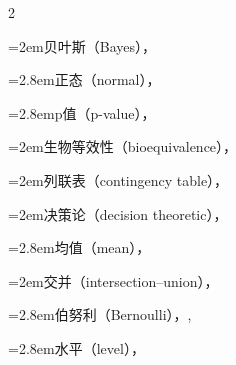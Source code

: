 \begin{multicols}{2}
\par\noindent\hangindent=2em\hspace*{1em}\label{idx:487}贝叶斯（Bayes），\hyperref[sec:8.5.2]{\pageref*{sec:8.5.2}}\par
{}
\par\noindent\hangindent=2.8em\hspace*{1.8em}\label{idx:488}正态（normal），\hyperref[ex:8.2.7]{\pageref*{ex:8.2.7}}\par
\par\noindent\hangindent=2.8em\hspace*{1.8em}\label{idx:489}p值（p-value），\hyperref[exercise:8.53]{\pageref*{exercise:8.53}}\par
\par\noindent\hangindent=2em\hspace*{1em}\label{idx:490}生物等效性（bioequivalence），\hyperref[exercise:8.47]{\pageref*{exercise:8.47}}\par
\par\noindent\hangindent=2em\hspace*{1em}\label{idx:491}列联表（contingency table），\hyperref[exercise:10.31]{\pageref*{exercise:10.31}}\par
\par\noindent\hangindent=2em\hspace*{1em}\label{idx:492}决策论（decision theoretic），\hyperref[sec:8.3.5]{\pageref*{sec:8.3.5}}\par
\par\noindent\hangindent=2.8em\hspace*{1.8em}\label{idx:493}均值（mean），\hyperref[ex:8.3.31]{\pageref*{ex:8.3.31}}\par
\par\noindent\hangindent=2em\hspace*{1em}\label{idx:494}交并（intersection–union），\hyperref[eq:8.2.6]{\pageref*{eq:8.2.6}}\par
\par\noindent\hangindent=2.8em\hspace*{1.8em}\label{idx:495}伯努利（Bernoulli），\hyperref[ex:8.2.9]{\pageref*{ex:8.2.9}}, \hyperref[ex:8.3.25]{\pageref*{ex:8.3.25}}\par
\par\noindent\hangindent=2.8em\hspace*{1.8em}\label{idx:496}水平（level），\hyperref[thm:8.3.23]{\pageref*{thm:8.3.23}}\par

\end{multicols}
